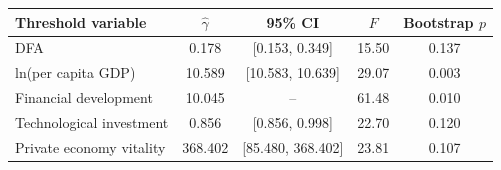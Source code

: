 \begin{tabular}{lcccc}
\toprule
Threshold variable & $\hat{\gamma}$ & 95\% CI & $F$ & Bootstrap $p$ \\
\midrule
DFA & 0.178 & [0.153, 0.349] & 15.50 & 0.137 \\
ln(per capita GDP) & 10.589 & [10.583, 10.639] & 29.07 & 0.003 \\
Financial development & 10.045 & -- & 61.48 & 0.010 \\
Technological investment & 0.856 & [0.856, 0.998] & 22.70 & 0.120 \\
Private economy vitality & 368.402 & [85.480, 368.402] & 23.81 & 0.107 \\
\bottomrule
\end{tabular}